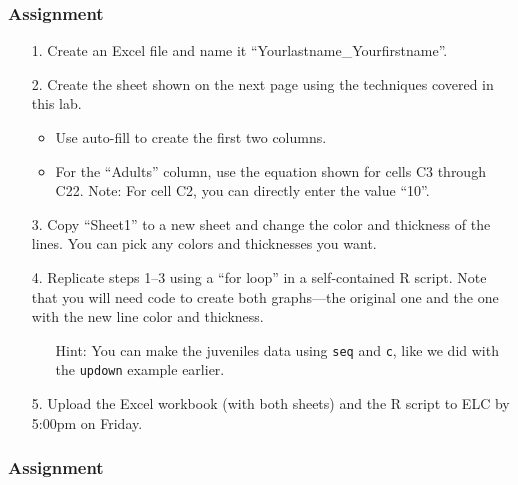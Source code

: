 \documentclass[color=usenames,dvipsnames]{beamer}\usepackage[]{graphicx}\usepackage[]{xcolor}
\newcommand{\inr}[1]{\colorbox{inlinecolor}{\texttt{#1}}}
\begin{document}
\begin{frame}
  \frametitle{Assignment}
  \small %
  \begin{enumerate}
    \item[1.] Create an Excel file and name it
      ``Yourlastname\_Yourfirstname''. 
    \item[2.] Create the sheet shown on the next page using the
      techniques covered in this lab. 
      \begin{itemize}
        \footnotesize
        \item Use auto-fill to create the first two columns.
        \item For the ``Adults'' column, use the equation shown
          for cells C3 through C22. Note: For cell C2, you can
          directly enter the value ``10''.
      \end{itemize}
    \item[3.] Copy ``Sheet1'' to a new sheet and change the color and
      thickness of the lines. You can pick any colors and thicknesses
      you want. 
    \item[4.] Replicate steps 1--3 using a ``for
      loop'' in a self-contained {R} script. Note that you will need
      code to create both graphs---the original one and the one with
      the new line color and thickness.  
      \begin{itemize}
      \item[] Hint: You can make the juveniles data using \inr{seq}
        and \inr{c}, like we did with the \inr{updown} example earlier.  
      \end{itemize}
    \item[5.] Upload the Excel workbook (with both sheets) and the
      R script to ELC by 5:00pm on Friday.
  \end{enumerate}
\end{frame}


\begin{frame}
  \frametitle{Assignment}
\end{frame}
\end{document}
